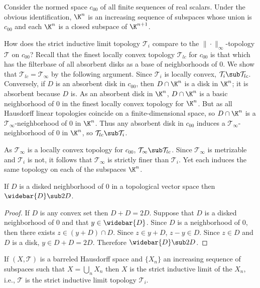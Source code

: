\begin{example}
Consider the normed space $c_{00}$ of all finite sequences of real scalars. Under the obvious identification, $\K^n$ is an increasing sequence of subspaces whose union is $c_{00}$ and each $\K^n$ is a closed subspace of $\K^{n+1}$.\par
How does the strict inductive limit topology $\mathcal{T}_i$ compare to the $\|\cdot\|_\infty$-topology $\mathcal{T}$ on $c_{00}$? Recall that the finest locally convex topology $\mathcal{T}_{lc}$ for $c_{00}$ is that which has the filterbase of all absorbent disks as a base of neighborhoods of $0$. We show that $\mathcal{T}_{lc}=\mathcal{T}_\infty$ by the following argument. Since $\mathcal{T}_i$ is locally convex, $\mathcal{T}_{i}\sub\mathcal{T}_{lc}$. Conversely, if $D$ is an absorbent disk in $c_{00}$, then $D\cap\K^n$ is a disk in $\K^n$; it is absorbent because $D$ is. As an absorbent disk in $\K^n$, $D\cap\K^n$ is a basic neighborhood of $0$ in the finest locally convex topology for $\K^n$. But as all Hausdorff linear topologies coincide on a finite-dimensional space, so $D\cap\K^n$ is a $\mathcal{T}_\infty$-neighborhood of $0$ in $\K^n$. Thus any absorbent disk in $c_{00}$ induces a $\mathcal{T}_\infty$-neighborhood of $0$ in $\K^n$, so $\mathcal{T}_{lc}\sub\mathcal{T}_i$.\par
As $\mathcal{T}_\infty$ is a locally convex topology for $c_{00}$, $\mathcal{T}_{\infty}\sub\mathcal{T}_{lc}$. Since $\mathcal{T}_\infty$ is metrizable and $\mathcal{T}_i$ is not, it follows that $\mathcal{T}_\infty$ is strictly finer than $\mathcal{T}_i$. Yet each induces the same topology on each of the subspaces $\K^n$.
\end{example}
\begin{proposition}\label{TVS disk closure}
If $D$ is a disked neighborhood of $0$ in a topological vector space then $\widebar{D}\sub 2D$.
\end{proposition}
\begin{proof}
If $D$ is any convex set then $D+D=2D$. Suppose that $D$ is a disked neighborhood of $0$ and that $y\in\widebar{D}$. Since $D$ is a neighborhood of $0$, then there exists $z\in(y+D)\cap D$. Since $z\in y+D$, $z-y\in D$. Since $z\in D$ and $D$ is a disk, $y\in D+D=2D$. Therefore $\widebar{D}\sub 2D$.
\end{proof}
\begin{proposition}\label{LCHS barreled is strict inductive limit}
If $(X,\mathcal{T})$ is a barreled Hausdorff space and $\{X_n\}$ an increasing sequence of subspaces such that $X=\bigcup_nX_n$ then $X$ is the strict inductive limit of the $X_n$, i.e., $\mathcal{T}$ is the strict inductive limit topology $\mathcal{T}_i$.
\end{proposition}
